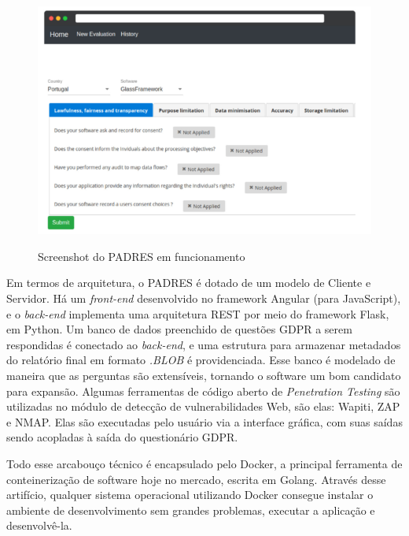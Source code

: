 \begin{figure}[ht]
    \centering
    \caption{Screenshot do PADRES em funcionamento}
    \includegraphics[width=14cm]{figuras/padres.png} 
    \label{fig:internet} 
\end{figure}

Em termos de arquitetura, o PADRES é dotado de um modelo de Cliente e Servidor. Há um \textit{front-end} desenvolvido no framework Angular (para JavaScript), e o \textit{back-end} implementa uma arquitetura REST por meio do framework Flask, em Python. Um banco de dados preenchido de questões GDPR a serem respondidas é conectado ao \textit{back-end}, e uma estrutura para armazenar metadados do relatório final em formato \textit{.BLOB} é providenciada. Esse banco é modelado de maneira que as perguntas são extensíveis, tornando o software um bom candidato para expansão. Algumas ferramentas de código aberto de \textit{Penetration Testing} são utilizadas no módulo de detecção de vulnerabilidades Web, são elas: Wapiti, ZAP e NMAP. Elas são executadas pelo usuário via a interface gráfica, com suas saídas sendo acopladas à saída do questionário GDPR.

Todo esse arcabouço técnico é encapsulado pelo Docker, a principal ferramenta de conteinerização de software hoje no mercado, escrita em Golang. Através desse artifício, qualquer sistema operacional utilizando Docker consegue instalar o ambiente de desenvolvimento sem grandes problemas, executar a aplicação e desenvolvê-la. 

